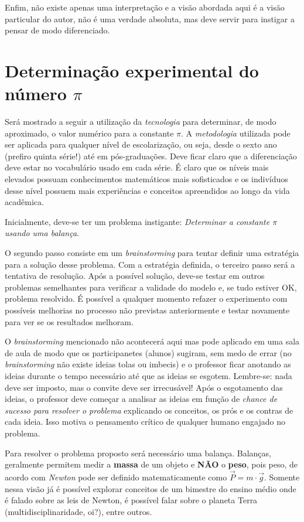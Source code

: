 Enfim, não existe apenas uma interpretação e a visão abordada aqui é a visão particular do autor, não é uma verdade absoluta, mas deve servir para instigar a pensar de modo diferenciado.

\section{Determinação experimental do número $\pi$}

Será mostrado a seguir a utilização da \textit{tecnologia} para determinar, de modo aproximado, o valor numérico para a constante $\pi$. A \textit{metodologia} utilizada pode ser aplicada para qualquer nível de escolarização, ou seja, desde o sexto ano (prefiro quinta série!) até em pós-graduações. Deve ficar claro que a diferenciação deve estar no vocabulário usado em cada série. É claro que os níveis mais elevados possuam conhecimentos matemáticos mais sofisticados e os indivíduos desse nível possuem mais experiências e conceitos apreendidos ao longo da vida acadêmica.

Inicialmente, deve-se ter um problema instigante: \textit{Determinar a constante $\pi$ usando uma balança}.

O segundo passo consiste em um \textit{brainstorming} para tentar definir uma estratégia para a solução desse problema. Com a estratégia definida, o terceiro passo será a tentativa de resolução. Após a possível solução, deve-se testar em outros problemas semelhantes para verificar a validade do modelo e, se tudo estiver OK, problema resolvido. É possível a qualquer momento refazer o experimento com possíveis melhorias no processo não previstas anteriormente e testar novamente para ver se os resultados melhoram.

O \textit{brainstorming} mencionado não acontecerá aqui mas pode aplicado em uma sala de aula de modo que os participanetes (alunos) sugiram, sem medo de errar (no \textit{brainstorming} não existe ideias tolas ou imbecis) e o professor ficar anotando as ideias durante o tempo necessário até que as ideias se esgotem. Lembre-se: nada deve ser imposto, mas o convite deve ser irrecusável! Após o esgotamento das ideias, o professor deve começar a analisar as ideias em função de \textit{chance de sucesso para resolver o problema} explicando os conceitos, os prós e os contras de cada ideia. Isso motiva o pensamento crítico de qualquer humano engajado no problema.

Para resolver o problema proposto será necessário uma balança. Balanças, geralmente permitem medir a \textbf{massa} de um objeto e \textbf{NÃO} o \textbf{peso}, pois peso, de acordo com \textit{Newton} pode ser definido matematicamente como $\vec{P} = m \cdot \vec{g}$. Somente nessa visão já é possível explorar conceitos de um bimestre do ensino médio onde é falado sobre as leis de Newton, é possível falar sobre o planeta Terra (multidisciplinaridade, oi?), entre outros.

